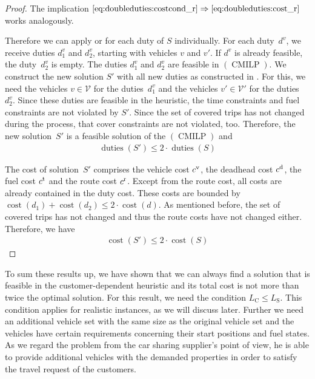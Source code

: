\begin{proof}
The implication ${\eqref{eq:doubleduties:costcond_r}\Rightarrow\eqref{eq:doubleduties:cost_r}}$ works analogously.

Therefore we can apply  or  for each duty of $S$ individually. For each duty~$d^v$, we receive duties $d^v_1$ and $d^v_2$, starting with vehicles $v$ and $v'$. If $d^v$ is already feasible, the duty~$d^v_2$ is empty. The duties $d^v_1$ and $d^v_2$ are feasible in $(\operatorname{CMILP})$. We construct the new solution $S'$ with all new duties as constructed in . For this, we need the vehicles $v\in\mathcal{V}$ for the duties~$d^v_1$ and the vehicles ${v'\in\mathcal{V}'}$ for the duties~$d^v_2$. Since these duties are feasible in the heuristic, the time constraints and fuel constraints are not violated by $S'$. Since the set of covered trips has not changed during the process, that cover constraints are not violated, too. Therefore, the new solution~$S'$ is a feasible solution of the $(\operatorname{CMILP})$ and
\begin{align*}
	\operatorname{duties}\left(S'\right) \leq 2\cdot\operatorname{duties}\left(S\right)
\end{align*}

The cost of solution~$S'$ comprises the vehicle cost $c^{\operatorname{v}}$, the deadhead cost $c^{\operatorname{d}}$, the fuel cost $c^{\operatorname{t}}$ and the route cost $c^{\operatorname{r}}$. Except from the route cost, all costs are already contained in the duty cost. These costs are bounded by ${\operatorname{cost}\left(d_1\right) + \operatorname{cost}\left(d_2\right) \leq 2\cdot\operatorname{cost}\left(d\right)}$. As mentioned before, the set of covered trips has not changed and thus the route costs have not changed either. Therefore, we have
\begin{align*}
	\operatorname{cost}\left(S'\right) \leq 2\cdot\operatorname{cost}\left(S\right)
\end{align*}

\end{proof}

To sum these results up, we have shown that we can always find a solution that is feasible in the customer-dependent heuristic and its total cost is not more than twice the optimal solution. For this result, we need the condition ${L_{\operatorname{C}}\leq L_{\operatorname{S}}}$. This condition applies for realistic instances, as we will discuss later. Further we need an additional vehicle set with the same size as the original vehicle set and the vehicles have certain requirements concerning their start positions and fuel states. As we regard the problem from the car sharing supplier's point of view, he is able to provide additional vehicles with the demanded properties in order to satisfy the travel request of the customers.

